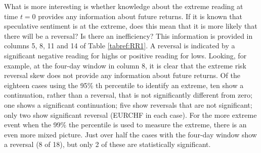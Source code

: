 \documentclass[12pt, a4paper, oneside]{article} %
\begin{document}
What is more interesting is whether knowledge about the extreme reading at time $t = 0$ provides any information about future returns.  If it is known that speculative sentiment is at the extreme, does this mean that it is more likely that there will be a reversal? Is there an inefficiency?  This information is provided in columns 5, 8, 11 and 14 of Table \ref{tabref:RR1}. A reversal is indicated by a significant negative reading for highs or positive reading for lows.   Looking, for example, at the four-day window in column 8, it is clear that the extreme risk reversal skew does not provide any information about future returns.  Of the eighteen cases using the 95\% th percentile to identify an extreme, ten show a continuation, rather than a reversal, that is not significantly different from zero; one shows a significant continuation; five show reversals that are not significant; only two show significant reversal (EURCHF in each case).  For the more extreme event when the 99\% the percentile is used to measure the extreme, there is an even more mixed picture.  Just over half the cases with the four-day window show a reversal (8 of 18), but only 2 of these are statistically significant.   
\end{document}
